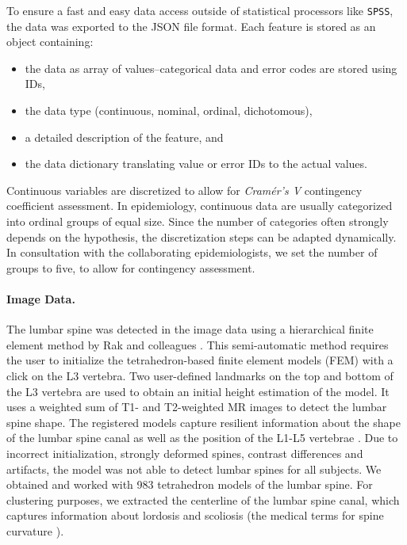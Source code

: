 \documentclass[journal]{style/vgtc} 			          %
\begin{document}
To ensure a fast and easy data access outside of statistical processors like \texttt{SPSS}, the data was exported to the JSON file format.
%
Each feature is stored as an object containing: 
\begin{itemize}
	\item the data as array of values--categorical data and error codes are stored using IDs,
	\item the data type (continuous, nominal, ordinal, dichotomous),
	\item a detailed description of the feature, and
	\item the data dictionary translating value or error IDs to the actual values.
\end{itemize}
%
Continuous variables are discretized to allow for \emph{Cram\'{e}r's V} contingency coefficient assessment.
%
In epidemiology, continuous data are usually categorized into ordinal groups of equal size.
%
Since the number of categories often strongly depends on the hypothesis, the discretization steps can be adapted dynamically.
In consultation with the collaborating epidemiologists, we set the number of groups to five, to allow for contingency assessment.

\paragraph{Image Data.} \label{Image-Data}
The lumbar spine was detected in the image data using a hierarchical finite element method by Rak and colleagues \cite{Rak2013}.
%
This semi-automatic method requires the user to initialize the tetrahedron-based finite element models (FEM) with a click on the L3 vertebra.
%
Two user-defined landmarks on the top and bottom of the L3 vertebra are used to obtain an initial height estimation of the model.
%
It uses a weighted sum of T1- and T2-weighted MR images to detect the lumbar spine shape.
%
The registered models capture resilient information about the shape of the lumbar spine canal as well as the position of the L1-L5 vertebrae \cite{Klemm2013VMV}.
%
Due to incorrect initialization, strongly deformed spines, contrast differences and artifacts, the model was not able to detect lumbar spines for all subjects.
%
We obtained and worked with 983 tetrahedron models of the lumbar spine.
%
For clustering purposes, we extracted the centerline of the lumbar spine canal, which captures information about lordosis and scoliosis (the medical terms for spine curvature \cite{Klemm2013VMV}).
\end{document}
